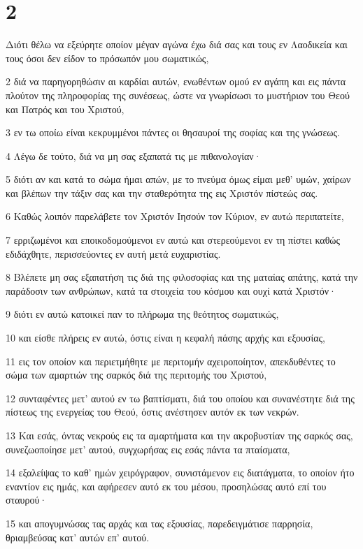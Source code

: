 \chapter{2}

\par Διότι θέλω να εξεύρητε οποίον μέγαν αγώνα έχω διά σας και τους εν Λαοδικεία και τους όσοι δεν είδον το πρόσωπόν μου σωματικώς,
\par 2 διά να παρηγορηθώσιν αι καρδίαι αυτών, ενωθέντων ομού εν αγάπη και εις πάντα πλούτον της πληροφορίας της συνέσεως, ώστε να γνωρίσωσι το μυστήριον του Θεού και Πατρός και του Χριστού,
\par 3 εν τω οποίω είναι κεκρυμμένοι πάντες οι θησαυροί της σοφίας και της γνώσεως.
\par 4 Λέγω δε τούτο, διά να μη σας εξαπατά τις με πιθανολογίαν·
\par 5 διότι αν και κατά το σώμα ήμαι απών, με το πνεύμα όμως είμαι μεθ' υμών, χαίρων και βλέπων την τάξιν σας και την σταθερότητα της εις Χριστόν πίστεώς σας.
\par 6 Καθώς λοιπόν παρελάβετε τον Χριστόν Ιησούν τον Κύριον, εν αυτώ περιπατείτε,
\par 7 ερριζωμένοι και εποικοδομούμενοι εν αυτώ και στερεούμενοι εν τη πίστει καθώς εδιδάχθητε, περισσεύοντες εν αυτή μετά ευχαριστίας.
\par 8 Βλέπετε μη σας εξαπατήση τις διά της φιλοσοφίας και της ματαίας απάτης, κατά την παράδοσιν των ανθρώπων, κατά τα στοιχεία του κόσμου και ουχί κατά Χριστόν·
\par 9 διότι εν αυτώ κατοικεί παν το πλήρωμα της θεότητος σωματικώς,
\par 10 και είσθε πλήρεις εν αυτώ, όστις είναι η κεφαλή πάσης αρχής και εξουσίας,
\par 11 εις τον οποίον και περιετμήθητε με περιτομήν αχειροποίητον, απεκδυθέντες το σώμα των αμαρτιών της σαρκός διά της περιτομής του Χριστού,
\par 12 συνταφέντες μετ' αυτού εν τω βαπτίσματι, διά του οποίου και συνανέστητε διά της πίστεως της ενεργείας του Θεού, όστις ανέστησεν αυτόν εκ των νεκρών.
\par 13 Και εσάς, όντας νεκρούς εις τα αμαρτήματα και την ακροβυστίαν της σαρκός σας, συνεζωοποίησε μετ' αυτού, συγχωρήσας εις εσάς πάντα τα πταίσματα,
\par 14 εξαλείψας το καθ' ημών χειρόγραφον, συνιστάμενον εις διατάγματα, το οποίον ήτο εναντίον εις ημάς, και αφήρεσεν αυτό εκ του μέσου, προσηλώσας αυτό επί του σταυρού·
\par 15 και απογυμνώσας τας αρχάς και τας εξουσίας, παρεδειγμάτισε παρρησία, θριαμβεύσας κατ' αυτών επ' αυτού.
